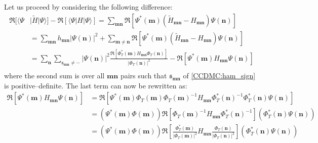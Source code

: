 Let us proceed by considering the following difference:
\begin{equation}
\begin{split}
 \Re [\langle \Psi& \lvert \widetilde{H}\rvert\Psi \rangle] -\Re\left[ \langle \Psi |H|\Psi \rangle\right]=  \sum_{\mathbf{m}\mathbf{n}} \Re \left[\Psi^*(\mathbf{m}) (\widetilde{H}_{\mathbf{m}\mathbf{n}}-H_{\mathbf{m}\mathbf{n}})\Psi(\mathbf{n})\right]\\ 
&= \sum_{\mathbf{m}\mathbf{n}} h_{\mathbf{m}\mathbf{n}}  \lvert\Psi(\mathbf{n})\rvert^2 +\sum_{\mathbf{m}\neq \mathbf{n}}  \Re \left[\Psi^*(\mathbf{m}) (\widetilde{H}_{\mathbf{m}\mathbf{n}}-H_{\mathbf{m}\mathbf{n}})\Psi(\mathbf{n})\right]\\
&= \sum_{\mathbf{n}} \sum_{\mathfrak{s}_{\mathbf{m}\mathbf{n}} \neq -} \lvert\Psi(\mathbf{n})\rvert^2  \frac{\Re \left [ \Phi_T^*(\mathbf{m}) H_{\mathbf{m}\mathbf{n}} \Phi_T(\mathbf{n})\right ]}{ \lvert \Phi_T (\mathbf{n}) \rvert ^2} - \Re \left [ \Psi^*(\mathbf{m}) H_{\mathbf{m}\mathbf{n}} \Psi(\mathbf{n})\right ]\\ 
\end{split}
\end{equation}
where the second sum is over all ${\mathbf{m}\mathbf{n}}$ pairs such that $\mathfrak{s}_{\mathbf{m}\mathbf{n}}$ of \eqref{CCDMC:ham_sign} is positive--definite. The last term
 can now be rewritten as:
\begin{equation}
\begin{split}
\Re \left [ \Psi^*(\mathbf{m}) H_{\mathbf{m}\mathbf{\mathbf{n}}} \Psi(\mathbf{\mathbf{n}})\right ] &= \Re \left [ \Psi^*(\mathbf{m}) \Phi_T(\mathbf{m}) \Phi_T(\mathbf{m})^{-1} H_{\mathbf{m}\mathbf{n}} \Phi_T^*(\mathbf{n})^{-1}\Phi_T^*(\mathbf{n})\Psi(\mathbf{n})\right ]\\
&= (\Psi^*(\mathbf{m}) \Phi(\mathbf{m}))\Re \left [\Phi_T(\mathbf{m})^{-1} H_{\mathbf{m}\mathbf{n}} \Phi_T^*(\mathbf{n})^{-1}\right ] (\Phi_T^*(\mathbf{n})\Psi(\mathbf{n}))\\
&= (\Psi^*(\mathbf{m}) \Phi(\mathbf{m}))\Re \left [\frac{\Phi_T^*(\mathbf{m})}{\lvert\Phi_T(\mathbf{m})\rvert^2} H_{\mathbf{m}\mathbf{n}} \frac{\Phi_T(\mathbf{n})}{\lvert\Phi_T(\mathbf{n})\rvert^2}\right ] (\Phi_T^*(\mathbf{n})\Psi(\mathbf{n}))\\
\end{split}
\end{equation}
